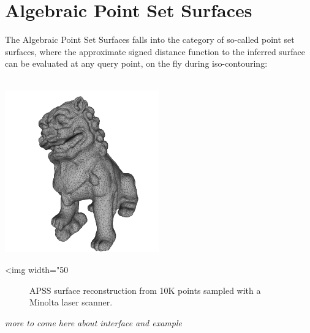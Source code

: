\section{Algebraic Point Set Surfaces}

The Algebraic Point Set Surfaces \cite{Guennebaud07} falls into the category of so-called point set surfaces, where the approximate signed distance function to the inferred surface can be evaluated at any query point, on the fly during iso-contouring: \\
  \\

\begin{center}
    \label{Surface_reconstruction_points_3-fig-APSS}
    \begin{ccTexOnly}
        \includegraphics[width=0.5\textwidth]{Surface_reconstruction_points_3/APSS} %
    \end{ccTexOnly}
    \begin{ccHtmlOnly}
        <img width="50%
    \end{ccHtmlOnly}
    \begin{figure}[h]
        \caption{APSS surface reconstruction from 10K
                 points sampled with a Minolta laser scanner.}
    \end{figure}
\end{center}


\emph{more to come here about interface and example}


